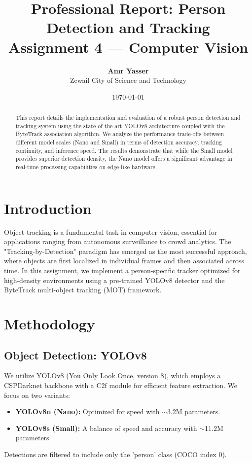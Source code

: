 \documentclass[11pt,a4paper]{article}
\title{\textbf{Professional Report: Person Detection and Tracking \\ \Large Assignment 4 --- Computer Vision}}
\author{\textbf{Amr Yasser} \\ Zewail City of Science and Technology}
\date{\today}
\begin{document}
\maketitle

\begin{abstract}
This report details the implementation and evaluation of a robust person detection and tracking system using the state-of-the-art YOLOv8 architecture coupled with the ByteTrack association algorithm. We analyze the performance trade-offs between different model scales (Nano and Small) in terms of detection accuracy, tracking continuity, and inference speed. The results demonstrate that while the Small model provides superior detection density, the Nano model offers a significant advantage in real-time processing capabilities on edge-like hardware.
\end{abstract}

\section{Introduction}
Object tracking is a fundamental task in computer vision, essential for applications ranging from autonomous surveillance to crowd analytics. The "Tracking-by-Detection" paradigm has emerged as the most successful approach, where objects are first localized in individual frames and then associated across time. In this assignment, we implement a person-specific tracker optimized for high-density environments using a pre-trained YOLOv8 detector and the ByteTrack multi-object tracking (MOT) framework.

\section{Methodology}

\subsection{Object Detection: YOLOv8}
We utilize YOLOv8 (You Only Look Once, version 8), which employs a CSPDarknet backbone with a C2f module for efficient feature extraction. We focus on two variants:
\begin{itemize}
    \item \textbf{YOLOv8n (Nano):} Optimized for speed with $\sim$3.2M parameters.
    \item \textbf{YOLOv8s (Small):} A balance of speed and accuracy with $\sim$11.2M parameters.
\end{itemize}
Detections are filtered to include only the 'person' class (COCO index 0).
\end{document}
